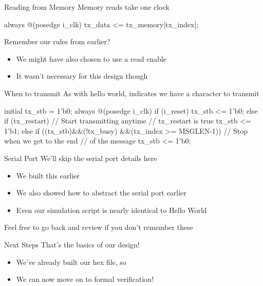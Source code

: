 \documentclass[style=gt,mode=present,paper=screen]{powerdot}
\begin{document}
%
%
\begin{slide}[bm=,toc=,method=direct]{Reading from Memory}
Memory reads take one clock
\begin{zformal}
always @(posedge i_clk)
	tx_data <= tx_memory[tx_index];
\end{zformal}
Remember our rules from earlier?
\begin{itemize}
\item We might have also chosen to use a read enable
\item It wasn't necessary for this design though
\end{itemize}
\end{slide}
%
%
\begin{slide}[bm=,toc=,method=direct]{When to transmit}
As with hello world,  indicates we have a character
to transmit
\begin{zformal}
initial	tx_stb = 1'b0;
always @(posedge i_clk)
if (i_reset)
	tx_stb <= 1'b0;
else if (tx_restart)
	// Start transmitting anytime
	// tx_restart is true
	tx_stb <= 1'b1;
else if ((tx_stb)&&(!tx_busy)
	    &&(tx_index >= MSGLEN-1))
	// Stop when we get to the end
	// of the message
	tx_stb <= 1'b0;
\end{zformal}
\end{slide}
%
%
\begin{slide}[method=direct]{Serial Port}
We'll skip the serial port details here
\begin{itemize}
\item We built this earlier
\item We also showed how to abstract the serial port earlier
\item Even our simulation script is nearly identical to Hello World
\end{itemize}
Feel free to go back and review if you don't remember these
\end{slide}
%
%
\begin{slide}[method=direct]{Next Steps}
That's the basics of our design!
\begin{itemize}
\item We've already built our hex file, so
\item We can now move on to formal verification!
\end{itemize}
\end{slide}
%
%
\end{document}
